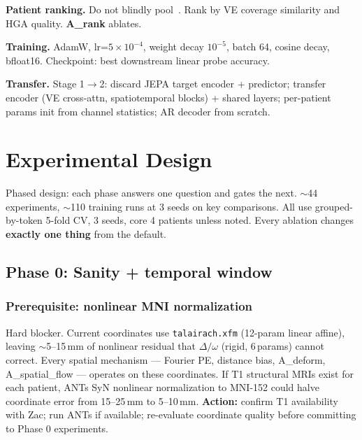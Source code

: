\documentclass[11pt,letterpaper]{article}
\begin{document}
\textbf{Patient ranking.} \textcolor{BrickRed}{Do not blindly pool}~\cite{jiang2025,wu2025mibrain}. Rank by VE coverage similarity and HGA quality. \textbf{A\_rank} ablates.

\textbf{Training.} AdamW, lr=$5 \times 10^{-4}$, weight decay $10^{-5}$, batch 64, cosine decay, bfloat16. Checkpoint: best downstream linear probe accuracy.

\textbf{Transfer.} Stage 1$\to$2: discard JEPA target encoder + predictor; transfer encoder (VE cross-attn, spatiotemporal blocks) + shared layers; per-patient params init from channel statistics; AR decoder from scratch.



\section{Experimental Design}\label{sec:experiments}

Phased design: each phase answers one question and gates the next. ${\sim}$44 experiments, ${\sim}$110 training runs at 3 seeds on key comparisons. All use grouped-by-token 5-fold CV, 3 seeds, core 4 patients unless noted. Every ablation changes \textbf{exactly one thing} from the default.

\subsection{Phase 0: Sanity + temporal window}\label{sec:phase0}

\subsubsection{Prerequisite: nonlinear MNI normalization}

\textcolor{BrickRed}{Hard blocker.} Current coordinates use \texttt{talairach.xfm} (12-param linear affine), leaving ${\sim}$5--15\,mm of nonlinear residual that $\Delta/\omega$ (rigid, 6\,params) cannot correct. Every spatial mechanism --- Fourier PE, distance bias, A\_deform, A\_spatial\_flow --- operates on these coordinates. If T1 structural MRIs exist for each patient, ANTs SyN nonlinear normalization to MNI-152 could halve coordinate error from 15--25\,mm to 5--10\,mm. \textbf{Action:} confirm T1 availability with Zac; run ANTs if available; re-evaluate coordinate quality before committing to Phase 0 experiments.
\end{document}
